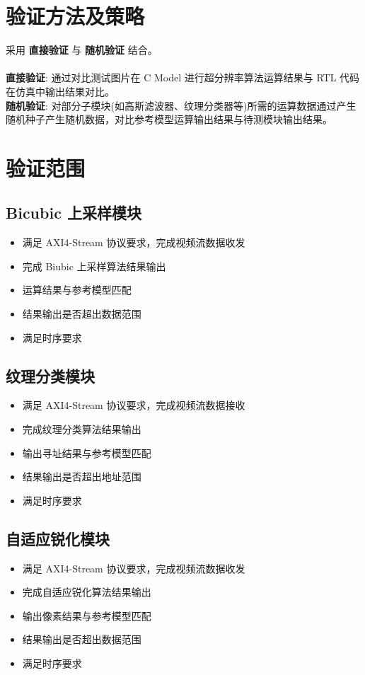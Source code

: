 \documentclass[12pt, a4paper, oneside]{ctexbook}
\begin{document}
	\chapter{验证方法及策略}
	采用 \textbf{直接验证} 与 \textbf{随机验证} 结合。\\ \\
	\textbf{直接验证}: 通过对比测试图片在 C Model 进行超分辨率算法运算结果与 RTL 代码在仿真中输出结果对比。\\
	\textbf{随机验证}: 对部分子模块(如高斯滤波器、纹理分类器等)所需的运算数据通过产生随机种子产生随机数据，对比参考模型运算输出结果与待测模块输出结果。
	
	
	\chapter{验证范围}
		\section{Bicubic 上采样模块}
		\begin{itemize}
			\item 满足 AXI4-Stream 协议要求，完成视频流数据收发
			\item 完成 Biubic 上采样算法结果输出
			\item 运算结果与参考模型匹配
			\item 结果输出是否超出数据范围
			\item 满足时序要求
		\end{itemize}
	
		\section{纹理分类模块}
		\begin{itemize}
			\item 满足 AXI4-Stream 协议要求，完成视频流数据接收
			\item 完成纹理分类算法结果输出
			\item 输出寻址结果与参考模型匹配
			\item 结果输出是否超出地址范围
			\item 满足时序要求
		\end{itemize}

		\section{自适应锐化模块}
		\begin{itemize}
			\item 满足 AXI4-Stream 协议要求，完成视频流数据收发
			\item 完成自适应锐化算法结果输出
			\item 输出像素结果与参考模型匹配
			\item 结果输出是否超出数据范围
			\item 满足时序要求		
		\end{itemize}
	
\end{document}
